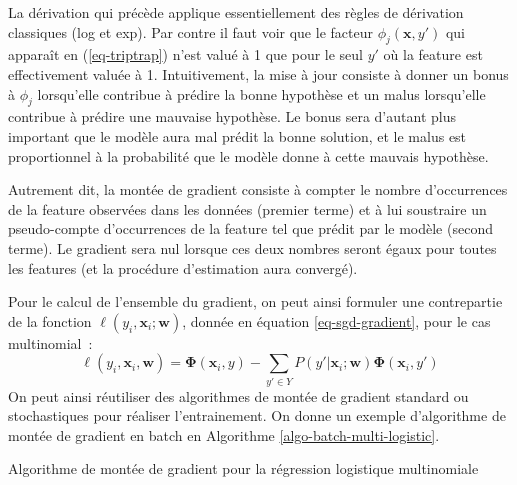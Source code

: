 \documentclass[11pt,openany]{book}
\begin{document}
La dérivation qui précède applique essentiellement des règles de
dérivation classiques (log et exp). Par contre il faut voir que le facteur 
$\phi_j(\mathbf{x},y')$ qui apparaît en  (\ref{eq-triptrap})
n'est valué à 1 que pour le seul $y'$ où la feature est effectivement
valuée à 1. 
Intuitivement, la mise à jour consiste à donner un bonus à $\phi_j$
lorsqu'elle
contribue à prédire la bonne hypothèse et un malus lorsqu'elle
contribue à prédire une mauvaise hypothèse. 
Le bonus sera d'autant plus important que le modèle aura mal prédit la
bonne solution, et le malus est proportionnel à la
probabilité que le modèle donne à  cette mauvais hypothèse.

Autrement dit, la montée de gradient consiste à compter le nombre
d'occurrences de la feature observées dans les données (premier terme)
et à lui soustraire un pseudo-compte d'occurrences de la feature tel
que prédit par le modèle (second terme).
Le gradient sera nul lorsque ces deux nombres seront égaux pour toutes
les features (et la procédure d'estimation aura convergé). 

Pour le calcul de l'ensemble du gradient, on peut ainsi formuler une contrepartie de la fonction $\ell(y_i,\mathbf{x}_i;\mathbf{w})$,
donnée en équation \ref{eq-sgd-gradient}, pour le cas multinomial~:
\begin{displaymath}
\ell(y_i,\mathbf{x}_i,\mathbf{w}) = \boldsymbol\Phi(\mathbf{x}_{i},y)
-  \sum_{y'\in Y} P(y'|\mathbf{x}_i;\mathbf{w}) \boldsymbol\Phi(\mathbf{x}_i,y')
\end{displaymath}
On peut ainsi réutiliser des algorithmes de montée de gradient
standard ou stochastiques pour réaliser l'entrainement. On donne un
exemple d'algorithme de montée de gradient en batch en Algorithme 
\ref{algo-batch-multi-logistic}.

\begin{algorithm}[htbp]
\caption{\label{algo-batch-multi-logistic}Algorithme de
  montée de gradient pour la régression logistique multinomiale}
\end{algorithm}
\end{document}
